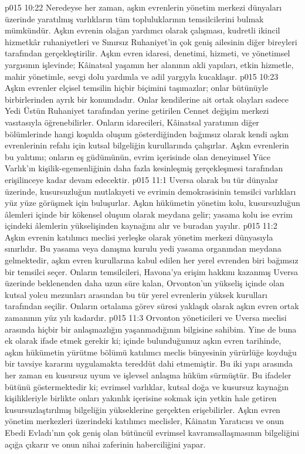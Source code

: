 \vs p015 10:22 Neredeyse her zaman, aşkın evrenlerin yönetim merkezi dünyaları üzerinde yaratılmış varlıkların tüm topluluklarının temsilcilerini bulmak mümkündür. Aşkın evrenin olağan yardımcı olarak çalışması, kudretli ikincil hizmetkâr ruhaniyetleri ve Sınırsız Ruhaniyet’in çok geniş ailesinin diğer bireyleri tarafından gerçekleştirilir. Aşkın evren idaresi, denetimi, hizmeti, ve yönetimsel yargısının işlevinde; Kâinatsal yaşamın her alanının akli yapıları, etkin hizmetle, mahir yönetimle, sevgi dolu yardımla ve adil yargıyla kucaklaşır.
\vs p015 10:23 Aşkın evrenler elçisel temsilin hiçbir biçimini taşımazlar; onlar bütünüyle birbirlerinden ayrık bir konumdadır. Onlar kendilerine ait ortak olayları sadece Yedi Üstün Ruhaniyet tarafından yerine getirilen Cennet değişim merkezi vasıtasıyla öğrenebilirler. Onların idarecileri, Kâinatsal yaratımın diğer bölümlerinde hangi koşulda oluşum gösterdiğinden bağımsız olarak kendi aşkın evrenlerinin refahı için kutsal bilgeliğin kurullarında çalışırlar. Aşkın evrenlerin bu yalıtımı; onların eş güdümünün, evrim içerisinde olan deneyimsel Yüce Varlık’ın kişilik\hyp{}egemenliğinin daha fazla kesinleşmiş gerçekleşmesi tarafından erişilinceye kadar devam edecektir.
\vs p015 11:1 Uversa olarak bu tür dünyalar üzerinde, kusursuzluğun mutlakıyeti ve evrimin demokrasisinin temsilci varlıkları yüz yüze görüşmek için buluşurlar. Aşkın hükümetin yönetim kolu, kusursuzluğun âlemleri içinde bir kökensel oluşum olarak meydana gelir; yasama kolu ise evrim içindeki âlemlerin yükselişinden kaynağını alır ve buradan yayılır.
\vs p015 11:2 Aşkın evrenin katılımcı meclisi yerleşke olarak yönetim merkezi dünyasıyla sınırlıdır. Bu yasama veya danışma kurulu yedi yasama organından meydana gelmektedir, aşkın evren kurullarına kabul edilen her yerel evrenden biri bağımsız bir temsilci seçer. Onların temsilcileri, Havona’ya erişim hakkını kazanmış Uversa üzerinde beklenenden daha uzun süre kalan, Orvonton’un yükseliş içinde olan kutsal yolcu mezunları arasından bu tür yerel evrenlerin yüksek kurulları tarafından seçilir. Onların ortalama görev süresi yaklaşık olarak aşkın evren ortak zamanının yüz yılı kadardır.
\vs p015 11:3 Orvonton yöneticileri ve Uversa meclisi arasında hiçbir bir anlaşmazlığın yaşanmadığının bilgisine sahibim. Yine de buna ek olarak ifade etmek gerekir ki; içinde bulunduğumuz aşkın evren tarihinde, aşkın hükümetin yürütme bölümü katılımcı meclis bünyesinin yürürlüğe koyduğu bir tavsiye kararını uygulamakta tereddüt dahi etmemiştir. Bu iki yapı arasında her zaman en kusursuz uyum ve işlevsel anlaşma hüküm sürmüştür. Bu ifadeler bütünü göstermektedir ki; evrimsel varlıklar, kutsal doğa ve kusursuz kaynağın kişilikleriyle birlikte onları yakınlık içerisine sokmak için yetkin hale getiren kusursuzlaştırılmış bilgeliğin yükseklerine gerçekten erişebilirler. Aşkın evren yönetim merkezleri üzerindeki katılımcı meclisler, Kâinatın Yaratıcısı ve onun Ebedi Evladı’nın çok geniş olan bütüncül evrimsel kavramsallaşmasının bilgeliğini açığa çıkarır ve onun nihai zaferinin haberciliğini yapar.
